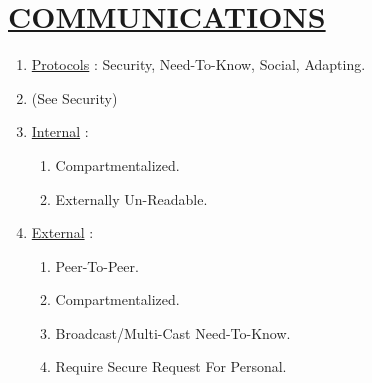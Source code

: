\documentclass[11pt]{article}
\begin{document}
\section*{\ul{COMMUNICATIONS}}
\begin{enumerate}
	\item[] \ul{Protocols} : Security, Need-To-Know, Social, Adapting.
	
	\item[] (See Security)
	
	\item[] \ul{Internal} :
	\begin{enumerate}
		\item[] Compartmentalized.
		\item[] Externally Un-Readable.
	\end{enumerate}

	\item[] \ul{External} :
	\begin{enumerate}
		\item[] Peer-To-Peer.
		\item[] Compartmentalized.
		\item[] Broadcast/Multi-Cast Need-To-Know.
		\item[] Require Secure Request For Personal.
	\end{enumerate}

\end{enumerate}
\end{document}
